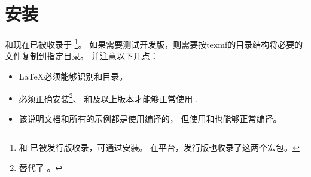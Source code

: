 \documentclass[../main.tex]{subfiles}
\begin{document}
\section{安装}

和现在已被收录于
\footnote{和
已被发行版收录，可通过安装。
在平台，发行版也收录了这两个宏包。}。
如果需要测试开发版，则需要按texmf的目录结构将必要的文件复制到指定目录。
并注意以下几点：

\begin{itemize}\setlength{\itemsep}{5pt}
\item \LaTeX{}必须能够识别和目录。
\item 必须正确安装\footnote{替代了
。}、 和及以上版本才能够正常使用
.
\item 该说明文档和所有的示例都是使用编译的，
但使用和也能够正常编译。
\end{itemize}
\end{document}
